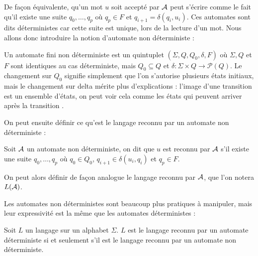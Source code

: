  De façon équivalente, qu'un mot $u$ soit accepté par $\mathcal A$ peut s'écrire comme le fait qu'il existe une suite $q_0,\ldots,q_p$ où $q_p\in F$ et $q_{i+1}=\delta(q_i,u_i)$. Ces automates sont dits déterministes car cette suite est unique, lors de la lecture d'un mot. Nous allons donc introduire la notion d'automate non déterministe :

 \begin{defi}
     Un automate fini non déterministe est un quintuplet $(\Sigma,Q,Q_0,\delta,F)$ où $\Sigma,Q$ et $F$ sont identiques au cas déterministe, mais $Q_0\subseteq Q$ et $\delta : \Sigma \times Q \to \mathcal P(Q)$. Le changement sur $Q_0$ signifie simplement que l'on s'autorise plusieurs états initiaux, mais le changement sur delta mérite plus d'explications : l'image d'une transition est un ensemble d'états, on peut voir cela comme \og les états qui peuvent arriver après la transition \fg{}.
 \end{defi}

 On peut ensuite définir ce qu'est le langage reconnu par un automate non déterministe :

 \begin{defi}
     Soit $\mathcal A$ un automate non déterministe, on dit que $u$ est reconnu par $\mathcal A$ s'il existe une suite $q_0,\ldots,q_p$ où $q_0\in Q_0$, $q_{i+1}\in \delta(u_i,q_i)$ et $q_p\in F$.

     On peut alors définir de façon analogue le langage reconnu par $\mathcal A$, que l'on notera $L(\mathcal A)$.
 \end{defi}

 Les automates non déterministes sont beaucoup plus pratiques à manipuler, mais leur expressivité est la même que les automates déterministes :

 \begin{them}
    Soit $L$ un langage sur un alphabet $\Sigma$. $L$ est le langage reconnu par un automate déterministe si et seulement s'il est le langage reconnu par un automate non déterministe.
 \end{them}

